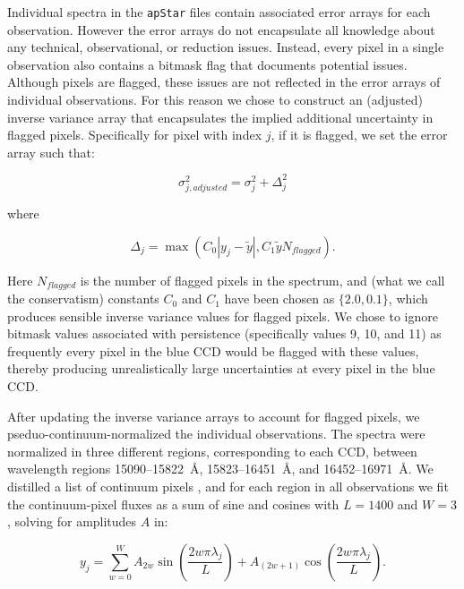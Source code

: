 \documentclass[12pt,preprint]{aastex}
\begin{document}
Individual spectra in the \texttt{apStar} files contain associated error arrays
for each observation.  However the error arrays do not encapsulate all knowledge
about any technical, observational, or reduction issues.  Instead, every pixel
in a single observation also contains a bitmask flag that documents potential
issues.  Although pixels are flagged, these issues are not reflected in the
error arrays of individual observations.  For this reason we chose to construct
an (adjusted) inverse variance array that encapsulates the implied additional 
uncertainty in flagged pixels.  Specifically for pixel with index $j$, if it is flagged, we set the error
array such that:



\begin{equation}
\sigma_{j,adjusted}^2 = \sigma_{j}^2 + \Delta_{j}^2
\end{equation}

\noindent{}where

\begin{equation}
\Delta_{j} = \max{\left(C_{0}|y_{j} - \widetilde{y}|,C_{1}\widetilde{y}N_{flagged}\right)} .
\end{equation}

Here $N_{flagged}$ is the number of flagged pixels in the spectrum, and (what
we call the conservatism) constants $C_0$ and $C_1$ have been chosen as 
$\{2.0,0.1\}$, which produces sensible inverse variance values for flagged
pixels.  We chose to ignore bitmask values associated with persistence 
(specifically values 9, 10, and 11) as frequently every pixel in the blue CCD
would be flagged with these values, thereby producing unrealistically large 
uncertainties at every pixel in the blue CCD.


After updating the inverse variance arrays to account for flagged pixels, we
pseduo-continuum-normalized the individual observations. The spectra were 
normalized in three different regions, corresponding to each CCD, between
wavelength regions 15090--15822~\AA, 15823--16451~\AA, and 16452--16971~\AA.
We distilled a list of continuum pixels \citep[following the initial 
identification in][]{tc}, and for each region in all observations we fit
the continuum-pixel fluxes as a sum of sine and cosines with $L = 1400$ and 
$W = 3$, solving for amplitudes $A$ in:

\begin{equation}
y_j = \sum_{w=0}^{W} A_{2w}\sin{\left(\frac{2w\pi\lambda_{j}}{L}\right)} + A_{(2w+1)}\cos{\left(\frac{2w\pi\lambda_{j}}{L}\right)}.
\end{equation}
\end{document}
